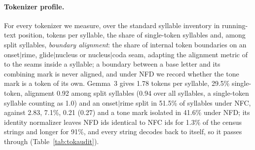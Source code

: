 \paragraph{Tokenizer profile.}
For every tokenizer we measure, over the standard syllable inventory in running-text position, tokens per syllable, the share of single-token syllables and, among split syllables, \emph{boundary alignment}: the share of internal token boundaries on an onset$|$rime, glide$|$nucleus or nucleus$|$coda seam, adapting the alignment metric of \citet{2026-acl-long-634} to the seams inside a syllable; a boundary between a base letter and its combining mark is never aligned, and under NFD we record whether the tone mark is a token of its own. Gemma~3 gives 1.78 tokens per syllable, 29.5\% single-token, alignment 0.92 among split syllables (0.94 over all syllables, a single-token syllable counting as 1.0) and an onset$|$rime split in 51.5\% of syllables under NFC, against 2.83, 7.1\%, 0.21 (0.27) and a tone mark isolated in 41.6\% under NFD; its identity normalizer leaves NFD ids identical to NFC ids for 1.3\% of the census strings and longer for 91\%, and every string decodes back to itself, so it passes through (Table~\ref{tab:tokaudit}). 

